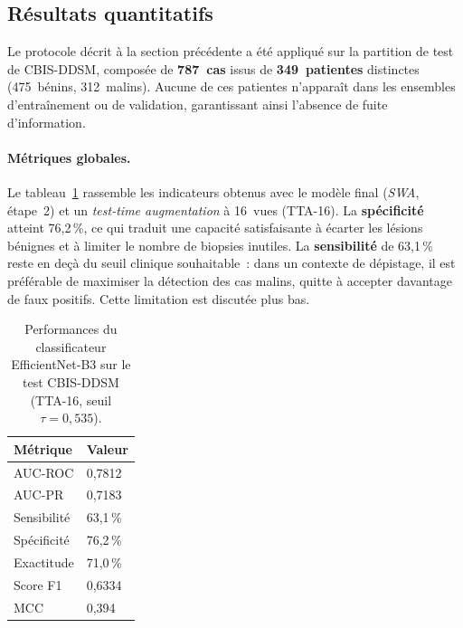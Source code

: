 \subsection{Résultats quantitatifs}
\label{subsec:ch3-resultats-quantitatifs}

Le protocole décrit à la section précédente a été appliqué sur la
partition de test de CBIS-DDSM, composée de \textbf{787~cas} issus de
\textbf{349~patientes} distinctes (475~bénins, 312~malins). Aucune de
ces patientes n'apparaît dans les ensembles d'entraînement ou de
validation, garantissant ainsi l'absence de fuite d'information.

\paragraph{Métriques globales.}
Le tableau~\ref{tab:ch3-metriques-test} rassemble les indicateurs
obtenus avec le modèle final (\textit{SWA}, étape~2) et un
\textit{test-time augmentation} à 16~vues (TTA-16). La
\textbf{spécificité} atteint 76,2\,\%, ce qui traduit une capacité
satisfaisante à écarter les lésions bénignes et à limiter le nombre de
biopsies inutiles. La \textbf{sensibilité} de 63,1\,\% reste en deçà
du seuil clinique souhaitable~: dans un contexte de dépistage, il est
préférable de maximiser la détection des cas malins, quitte à accepter
davantage de faux positifs. Cette limitation est discutée plus bas.

\begin{table}[H]
    \centering
    \caption{Performances du classificateur EfficientNet-B3 sur le test
             CBIS-DDSM (TTA-16, seuil $\tau = 0{,}535$).}
    \label{tab:ch3-metriques-test}
    \begin{tabular}{ll}
        \toprule
        \textbf{Métrique} & \textbf{Valeur} \\
        \midrule
        AUC-ROC            & 0,7812 \\
        AUC-PR             & 0,7183 \\
        Sensibilité        & 63,1\,\% \\
        Spécificité        & 76,2\,\% \\
        Exactitude          & 71,0\,\% \\
        Score F1            & 0,6334 \\
        MCC                 & 0,394 \\
        \bottomrule
    \end{tabular}
\end{table}

